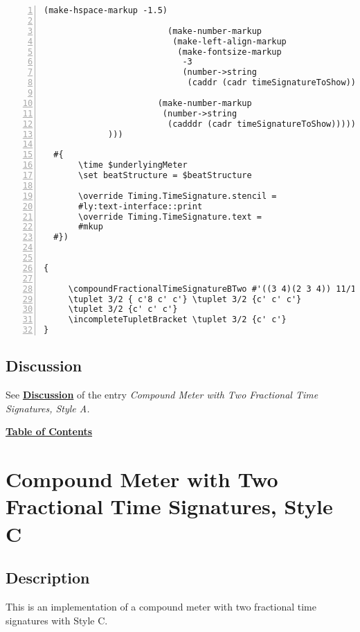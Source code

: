 \begin{Verbatim}[numbers=left,xleftmargin=5mm]
                         (make-hspace-markup -1.5)

                         (make-number-markup
                          (make-left-align-markup
                           (make-fontsize-markup
                            -3
                            (number->string
                             (caddr (cadr timeSignatureToShow))))))))

                       (make-number-markup
                        (number->string
                         (cadddr (cadr timeSignatureToShow)))))))))
             )))

  #{
       \time $underlyingMeter
       \set beatStructure = $beatStructure

       \override Timing.TimeSignature.stencil =
       #ly:text-interface::print
       \override Timing.TimeSignature.text =
       #mkup
  #})


{

     \compoundFractionalTimeSignatureBTwo #'((3 4)(2 3 4)) 11/12 3,3,3,2
     \tuplet 3/2 { c'8 c' c'} \tuplet 3/2 {c' c' c'}
     \tuplet 3/2 {c' c' c'}
     \incompleteTupletBracket \tuplet 3/2 {c' c'}
}
\end{Verbatim}
\subsection{Discussion}
See \hyperref[sec:compoundfractionalmeter_discussion]{\textbf{Discussion}} of the entry \textit{Compound Meter with Two Fractional Time Signatures, Style A.} \par
\hyperref[sec:toc]{\textbf{Table of Contents}}

\vfill \break




\section {Compound Meter with Two Fractional Time Signatures, Style C}

\hfill
{}
\hfill

\subsection{Description}
This is an implementation of a compound meter with two fractional time signatures with Style C.  

